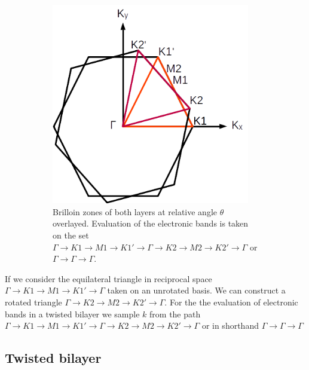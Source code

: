 \documentclass[12pt]{report} %
\begin{document}
\begin{figure}[t]
\begin{subfigure}[t]{0.45\textwidth}
    \includegraphics[width=0.95\textwidth]{heterostructure_BZ_path.png}
    \caption{
      Brilloin zones of both layers at relative angle $\theta$ overlayed. Evaluation of the electronic bands is taken on the set $\Gamma \rightarrow K1 \rightarrow M1 \rightarrow K1' \rightarrow \Gamma \rightarrow K2 \rightarrow M2 \rightarrow K2' \rightarrow \Gamma$ or $\Gamma \rightarrow \Gamma \rightarrow \Gamma$.
    }
    \label{heterostructure_BZ_path}
  \end{subfigure}
  \caption{
  }
\end{figure}

  If we consider the equilateral triangle in reciprocal space $\Gamma \rightarrow K1 \rightarrow M1 \rightarrow K1' \rightarrow \Gamma$ taken on an unrotated basis. We can construct a rotated triangle $\Gamma \rightarrow K2 \rightarrow M2 \rightarrow K2' \rightarrow \Gamma$. For the the evaluation of electronic bands in a twisted bilayer we sample $k$ from the path $\Gamma \rightarrow K1 \rightarrow M1 \rightarrow K1' \rightarrow \Gamma \rightarrow K2 \rightarrow M2 \rightarrow K2' \rightarrow \Gamma$ or in shorthand $\Gamma \rightarrow \Gamma \rightarrow \Gamma$

\subsection*{Twisted bilayer}
\end{document}
